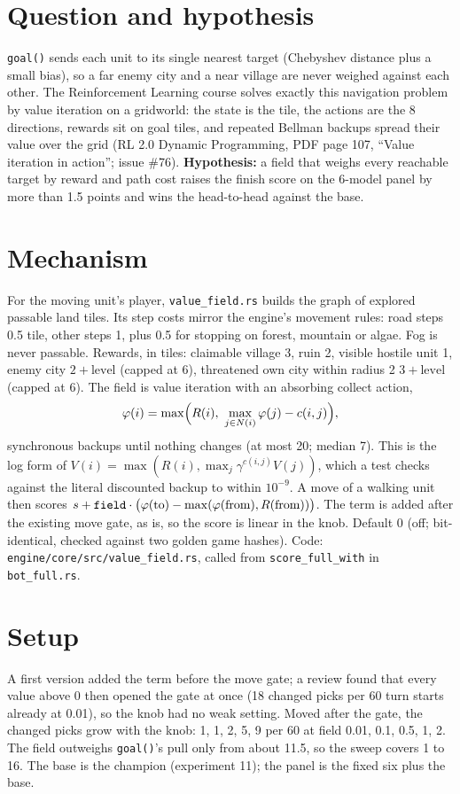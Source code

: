 \documentclass{../polyexp}
\begin{document}

\ExpHeader

\section{Question and hypothesis}
\texttt{goal()} sends each unit to its single nearest target (Chebyshev distance plus a small bias), so a far enemy city and a near village are never weighed against each other. The Reinforcement Learning course solves exactly this navigation problem by value iteration on a gridworld: the state is the tile, the actions are the 8 directions, rewards sit on goal tiles, and repeated Bellman backups spread their value over the grid (RL 2.0 Dynamic Programming, PDF page 107, ``Value iteration in action''; issue \#76). \textbf{Hypothesis:} a field that weighs every reachable target by reward and path cost raises the finish score on the 6-model panel by more than 1.5 points and wins the head-to-head against the base.

\section{Mechanism}
For the moving unit's player, \texttt{value\_field.rs} builds the graph of explored passable land tiles. Its step costs mirror the engine's movement rules: road steps 0.5 tile, other steps 1, plus 0.5 for stopping on forest, mountain or algae. Fog is never passable. Rewards, in tiles: claimable village 3, ruin 2, visible hostile unit 1, enemy city $2+\text{level}$ (capped at 6), threatened own city within radius 2 $3+\text{level}$ (capped at 6). The field is value iteration with an absorbing collect action,
\[
\varphi(i) = \max\Bigl(R(i),\ \max_{j \in N(i)} \varphi(j) - c(i,j)\Bigr),
\]
synchronous backups until nothing changes (at most 20; median 7). This is the log form of $V(i)=\max(R(i), \max_j \gamma^{c(i,j)} V(j))$, which a test checks against the literal discounted backup to within $10^{-9}$. A move of a walking unit then scores $s + \texttt{field}\cdot\bigl(\varphi(\text{to}) - \max(\varphi(\text{from}), R(\text{from}))\bigr)$. The term is added after the existing move gate, as  is, so the score is linear in the knob. Default 0 (off; bit-identical, checked against two golden game hashes). Code: \texttt{engine/core/src/value\_field.rs}, called from \texttt{score\_full\_with} in \texttt{bot\_full.rs}.

\section{Setup}
A first version added the term before the move gate; a review found that every value above 0 then opened the gate at once (18 changed picks per 60 turn starts already at 0.01), so the knob had no weak setting. Moved after the gate, the changed picks grow with the knob: 1, 1, 2, 5, 9 per 60 at field 0.01, 0.1, 0.5, 1, 2. The field outweighs \texttt{goal()}'s pull only from about 11.5, so the sweep covers 1 to 16. The base is the champion  (experiment 11); the panel is the fixed six plus the base.
\end{document}
